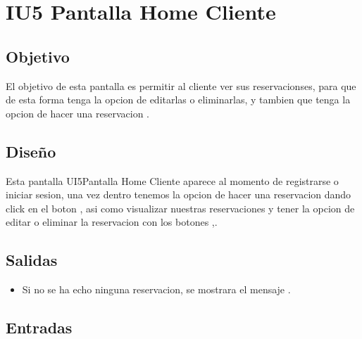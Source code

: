 \section{IU5 Pantalla Home Cliente}

\subsection{Objetivo}
	\cdtInstrucciones El objetivo de esta pantalla es permitir al cliente ver sus reservacionses, para que de esta forma tenga la opcion de editarlas o eliminarlas, y tambien que tenga la opcion de hacer una reservacion .

\subsection{Diseño}
	\cdtInstrucciones Esta pantalla {UI5}{Pantalla Home Cliente} aparece al momento de registrarse o iniciar sesion, una vez dentro tenemos la opcion de hacer una reservacion dando click en el boton , asi como visualizar nuestras reservaciones y tener la opcion de editar o eliminar la reservacion con los botones ,.



\subsection{Salidas}


	\begin{itemize}
		\item Si no se ha echo ninguna reservacion, se mostrara el mensaje .
	\end{itemize}
	
\subsection{Entradas}

